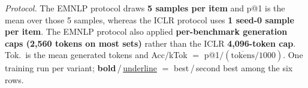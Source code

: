 \begin{table}[!t]
\vspace{3pt}
\parbox{\textwidth}{\footnotesize
\emph{Protocol.} The EMNLP protocol draws \textbf{5 samples per item} and p@1 is the
mean over those 5 samples, whereas the ICLR protocol uses \textbf{1 seed-0 sample per
item}. The EMNLP protocol also applied \textbf{per-benchmark generation caps
(2,560 tokens on most sets)} rather than the ICLR \textbf{4,096-token cap}.
Tok.\ is the mean generated tokens and
Acc/kTok $=$ p@1$/(\overline{\text{tokens}}/1000)$.
One training run per variant; \textbf{bold}\,/\,\underline{underline} $=$ best\,/\,second
best among the six rows.
\par}
\end{table}
